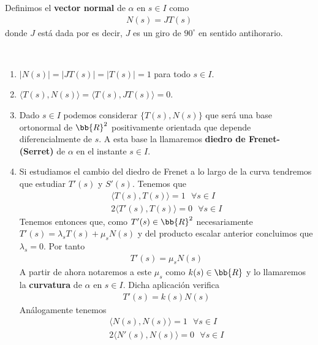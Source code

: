 \begin{definicion}
    Definimos el \textbf{vector normal} de $\alpha$ en $s\in I$ como
    \begin{gather*}
        N(s) = JT(s)
    \end{gather*}
    donde $J$ está dada por 
    es decir, $J$ es un giro de $90^\circ$ en sentido antihorario.
\end{definicion}

\begin{propiedades}\
    \begin{enumerate}
        \item $|N(s)| = |JT(s)| = |T(s)| = 1$ para todo $s\in I$.
        \item $\langle T(s), N(s) \rangle = \langle T(s), JT(s) \rangle = 0$.
        \item Dado $s\in I$ podemos considerar $\{T(s), N(s)\}$ que será una base ortonormal de $\bb{R}^2$ positivamente orientada que depende diferencialmente de $s$. A esta base la llamaremos \textbf{diedro de Frenet-(Serret)} de $\alpha$ en el instante $s\in I$.
        \item Si estudiamos el cambio del diedro de Frenet a lo largo de la curva tendremos que estudiar $T'(s)$ y $S'(s)$. Tenemos que 
        \begin{gather*}
            \langle T(s), T(s) \rangle = 1 \ \ \ \forall s\in I\\
            2\langle T'(s), T(s) \rangle = 0 \ \ \ \forall s \in I
        \end{gather*}
        Tenemos entonces que, como $T'(s)\in \bb{R}^2$ necesariamente 
        $T'(s) = \lambda_s T(s) + \mu_s N(s)$ y del producto escalar anterior concluimos que $\lambda_s = 0$. Por tanto 
        \begin{gather*}
            T'(s) = \mu_s N(s)
        \end{gather*}
        A partir de ahora notaremos a este $\mu_s$ como $k(s)\in \bb{R}$ y lo llamaremos la \textbf{curvatura} de $\alpha$ en $s\in I$. Dicha aplicación verifica
        \begin{gather*}
            T'(s) = k(s)N(s)
        \end{gather*}
        Análogamente tenemos 
        \begin{gather*}
            \langle N(s), N(s) \rangle = 1 \ \ \ \forall s\in I\\
            2\langle N'(s), N(s) \rangle = 0 \ \ \ \forall s \in I
        \end{gather*}

\end{enumerate}
\end{propiedades}
